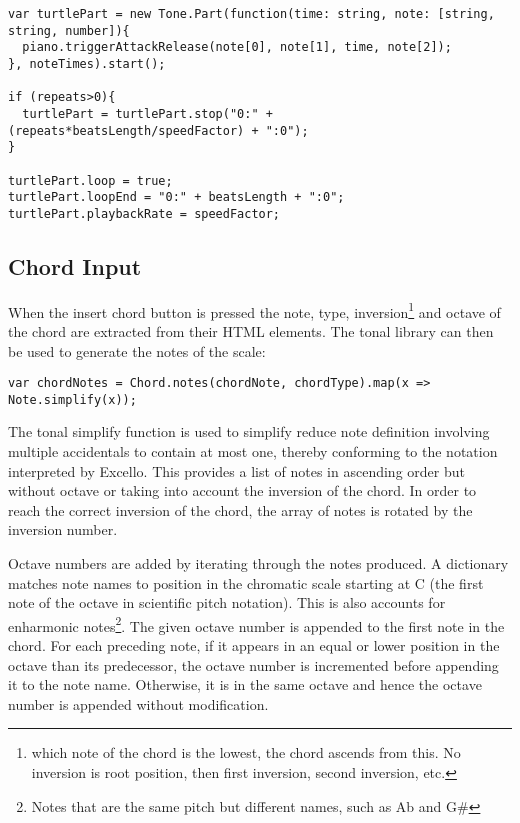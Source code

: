 \begin{verbatim}
var turtlePart = new Tone.Part(function(time: string, note: [string, string, number]){
  piano.triggerAttackRelease(note[0], note[1], time, note[2]);
}, noteTimes).start();

if (repeats>0){
  turtlePart = turtlePart.stop("0:" + (repeats*beatsLength/speedFactor) + ":0");
}

turtlePart.loop = true;
turtlePart.loopEnd = "0:" + beatsLength + ":0";
turtlePart.playbackRate = speedFactor;
\end{verbatim}

\subsection{Chord Input}

When the insert chord button is pressed the note, type, inversion\footnote{which note of the chord is the lowest, the chord ascends from this. No inversion is root position, then first inversion, second inversion, etc.} and octave of the chord are extracted from their HTML elements. The tonal library can then be used to generate the notes of the scale:

\begin{verbatim}
var chordNotes = Chord.notes(chordNote, chordType).map(x => Note.simplify(x));
\end{verbatim}

The tonal simplify function is used to simplify reduce note definition involving multiple accidentals to contain at most one, thereby conforming to the notation interpreted by Excello. This provides a list of notes in ascending order but without octave or taking into account the inversion of the chord. In order to reach the correct inversion of the chord, the array of notes is rotated by the inversion number.

Octave numbers are added by iterating through the notes produced. A dictionary matches note names to position in the chromatic scale starting at C (the first note of the octave in scientific pitch notation). This is also accounts for enharmonic notes\footnote{Notes that are the same pitch but different names, such as Ab and G\#}. The given octave number is appended to the first note in the chord. For each preceding note, if it appears in an equal or lower position in the octave than its predecessor, the octave number is incremented before appending it to the note name. Otherwise, it is in the same octave and hence the octave number is appended without modification.

